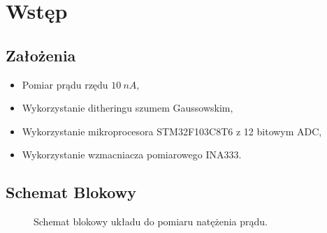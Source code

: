 \section{Wstęp}
    \subsection{Założenia}
        \begin{itemize}
            \item Pomiar prądu rzędu $10\ nA$,
            \item Wykorzystanie ditheringu szumem Gaussowskim, 
            \item Wykorzystanie mikroprocesora STM32F103C8T6 z 12 bitowym ADC,
            \item Wykorzystanie wzmacniacza pomiarowego INA333.
        \end{itemize}
    \subsection{Schemat Blokowy}
    \begin{figure}[!ht]
        \centering
        \scalebox{1}{}
        \caption{Schemat blokowy układu do pomiaru natężenia prądu.}
        \label{sch:BD}
    \end{figure}
